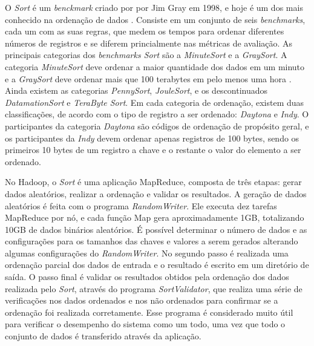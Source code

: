O \textit{Sort} é um \textit{benckmark} criado por por Jim Gray em 1998, e hoje é um dos mais conhecido na ordenação de dados \cite{Gray:1998}. 
Consiste em um conjunto de seis \textit{benchmarks}, cada um com as suas regras, que medem os tempos para ordenar diferentes números de registros e se diferem princialmente nas métricas de avaliação. 
As principais categorias dos \textit{benchmarks Sort} são a \textit{MinuteSort} e a \textit{GraySort}. A categoria \textit{MinuteSort} deve ordenar a maior quantidade dos dados em um minuto e a \textit{GraySort} deve ordenar mais que 100 terabytes em pelo menos uma hora \cite{White:2009}. Ainda existem as categorias \textit{PennySort}, \textit{JouleSort}, e os descontinuados  \textit{DatamationSort} e \textit{TeraByte Sort}. 
Em cada categoria de ordenação, existem duas classificações, de acordo com o tipo de registro a ser ordenado: \textit{Daytona} e \textit{Indy}. O participantes da categoria \textit{Daytona} são códigos de ordenação de propósito geral, e os participantes da \textit{Indy} devem ordenar apenas registros de 100 bytes, sendo os primeiros 10 bytes de um registro a chave e o restante o valor do elemento a ser ordenado.


No Hadoop, o \textit{Sort} é uma aplicação MapReduce, composta de três etapas: gerar dados aleatórios, realizar a ordenação e validar os resultados.
A geração de dados aleatórios é feita com o programa \textit{RandomWriter}. Ele executa dez tarefas MapReduce por nó, e cada função Map gera aproximadamente 1GB,  totalizando 10GB de dados binários aleatórios. 
É possível determinar o número de dados e as configurações para os tamanhos das chaves e valores a serem gerados alterando algumas configurações do \textit{RandomWriter}.
No segundo passo é realizada uma ordenação parcial dos dados de entrada e  o resultado é escrito em um diretório de saída. 
O passo final é validar os resultados obtidos pela ordenação dos dados realizada pelo \textit{Sort}, através do programa \textit{SortValidator}, que realiza uma série de verificações nos dados ordenados e nos não ordenados para confirmar se a ordenação foi realizada corretamente. 
Esse programa é considerado muito útil para verificar o desempenho do sistema como um todo, uma vez que todo o conjunto de dados é transferido através da aplicação.

